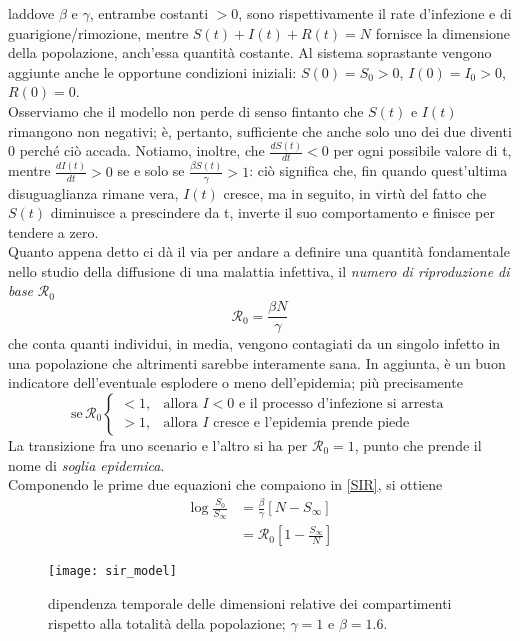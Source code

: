 laddove $\beta$ e $\gamma$, entrambe costanti $> 0$, sono rispettivamente il rate d'infezione e di guarigione/rimozione, mentre $S(t) + I(t) + R(t) = N$ fornisce la dimensione della popolazione, anch'essa quantità costante. Al sistema soprastante vengono aggiunte anche le opportune condizioni iniziali: $S(0) = S_0 > 0$, $I(0) = I_0 > 0$, $R(0) = 0$. \\ Osserviamo che il modello non perde di senso fintanto che $S(t)$ e $I(t)$ rimangono non negativi; è, pertanto, sufficiente che anche solo uno dei due diventi $0$ perché ciò accada. Notiamo, inoltre, che $\frac{dS(t)}{dt} < 0$ per ogni possibile valore di t, mentre $\frac{dI(t)}{dt} > 0$ se e solo se $\frac{\beta S(t)}{\gamma} > 1$: ciò significa che, fin quando quest'ultima disuguaglianza rimane vera, $I(t)$ cresce, ma in seguito, in virtù del fatto che $S(t)$ diminuisce a prescindere da t, inverte il suo comportamento e finisce per tendere a zero. \\ Quanto appena detto ci dà il via per andare a definire una quantità fondamentale nello studio della diffusione di una malattia infettiva, il \emph{numero di riproduzione di base} $\mathcal{R}_0$
\begin{equation}
\mathcal{R}_0 = \frac{\beta N}{\gamma}
\end{equation}
che conta quanti individui, in media, vengono contagiati da un singolo infetto in una popolazione che altrimenti sarebbe interamente sana. In aggiunta, è un buon indicatore dell'eventuale esplodere o meno dell'epidemia; più precisamente
\[
\text{se} \,\mathcal{R}_0
\begin{cases}
< 1, & \text{allora $I < 0$ e il processo d'infezione si arresta}\\
> 1, & \text{allora $I$ cresce e l'epidemia prende piede}
\end{cases}
\]
La transizione fra uno scenario e l'altro si ha per $\mathcal{R}_0 = 1$, punto che prende il nome di \emph{soglia epidemica}. \\ Componendo le prime due equazioni \cite{Brauer} che compaiono in \eqref{SIR}, si ottiene
\[
\begin{split}
\log \frac{S_0}{S_\infty} &= \frac{\beta}{\gamma} \left[ N - S_\infty \right ] \\
						  &= \mathcal{R}_0 \left[1 - \frac{S_\infty}{N} \right ]
\end{split}
\] 

	\begin{figure}
		\begin{center}
			\texttt{[image: sir\_model]}
			\caption{dipendenza temporale delle dimensioni relative dei compartimenti rispetto alla totalità della popolazione; $ \gamma = 1 $ e $ \beta = 1.6 $. \cite{Kiss}}
			\label{fig:evolution}
		\end{center}
	\end{figure}
